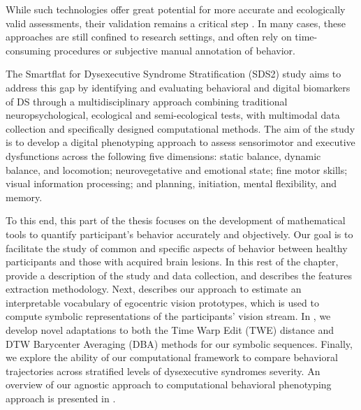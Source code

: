 While such technologies offer great potential for more accurate and ecologically valid assessments, their validation remains a critical step \cite{Renison2012}. In many cases, these approaches are still confined to research settings, and often rely on time-consuming procedures or subjective manual annotation of behavior.

The Smartflat for Dysexecutive Syndrome Stratification (SDS2) study aims to address this gap by identifying and evaluating behavioral and digital biomarkers of DS through a multidisciplinary approach combining traditional neuropsychological, ecological and semi-ecological tests, with multimodal data collection and specifically designed computational methods. The aim of the study is to develop a digital phenotyping approach to assess sensorimotor and executive dysfunctions across the following five dimensions: static balance, dynamic balance, and locomotion; neurovegetative and emotional state; fine motor skills; visual information processing; and planning, initiation, mental flexibility, and memory.

To this end, this part of the thesis focuses on the development of mathematical tools to quantify participant's behavior accurately and objectively. Our goal is to facilitate the study of common and specific aspects of behavior between healthy participants and those with acquired brain lesions. In this rest of the chapter,  provide a description of the study and data collection, and  describes the features extraction methodology. Next,   describes our approach to estimate an interpretable vocabulary of egocentric vision prototypes, which is used to compute symbolic representations of the participants' vision stream. In , we develop novel adaptations to both the Time Warp Edit (TWE) distance and DTW Barycenter Averaging (DBA) methods for our symbolic sequences. Finally, we explore the ability of our computational framework to compare behavioral trajectories across stratified levels of dysexecutive syndromes severity. An overview of our agnostic approach to computational behavioral phenotyping approach is presented in .


